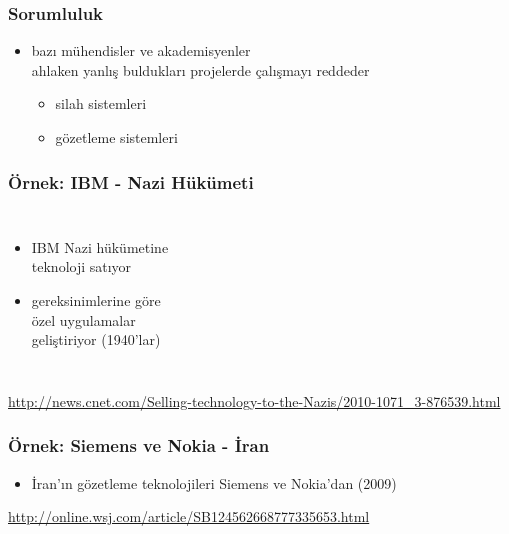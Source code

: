 \documentclass[dvipsnames]{beamer}
\theoremstyle{definition}
\theoremstyle{example}
\theoremstyle{plain}
\begin{document}
\begin{frame}
  \frametitle{Sorumluluk}

  \begin{itemize}
    \item bazı mühendisler ve akademisyenler\\
      ahlaken yanlış buldukları projelerde çalışmayı reddeder
    \begin{itemize}
      \item silah sistemleri
      \item gözetleme sistemleri
    \end{itemize}
  \end{itemize}
\end{frame}

\begin{frame}
  \frametitle{Örnek: IBM - Nazi Hükümeti}

  \begin{columns}

    \begin{itemize}
      \item IBM Nazi hükümetine\\
        teknoloji satıyor
      \item gereksinimlerine göre\\
        özel uygulamalar\\
        geliştiriyor (1940'lar)
    \end{itemize}
  \end{columns}

  \medskip
  \tiny{\url{http://news.cnet.com/Selling-technology-to-the-Nazis/2010-1071_3-876539.html}}\\
\end{frame}

\begin{frame}
  \frametitle{Örnek: Siemens ve Nokia - İran}

  \begin{center}
  \end{center}

  \begin{itemize}
    \item İran'ın gözetleme teknolojileri Siemens ve Nokia'dan (2009)
  \end{itemize}

  \medskip
  \tiny{\url{http://online.wsj.com/article/SB124562668777335653.html}}\\
\end{frame}
\end{document}
